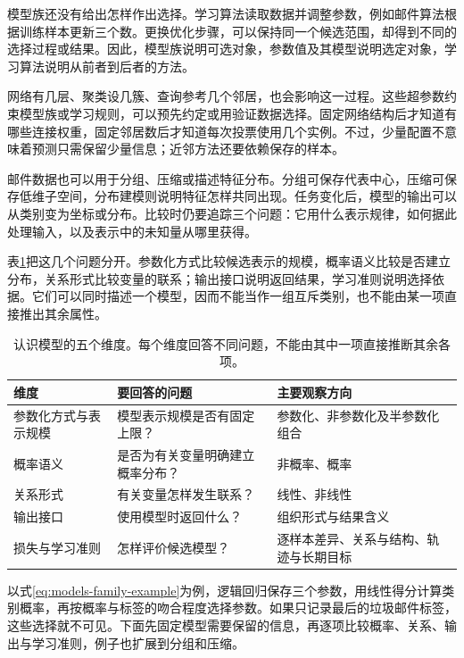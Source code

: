 模型族还没有给出怎样作出选择。学习算法读取数据并调整参数，例如邮件算法根据训练样本更新三个数。更换优化步骤，可以保持同一个候选范围，却得到不同的选择过程或结果。因此，模型族说明可选对象，参数值及其模型说明选定对象，学习算法说明从前者到后者的方法。

网络有几层、聚类设几簇、查询参考几个邻居，也会影响这一过程。这些超参数约束模型族或学习规则，可以预先约定或用验证数据选择。固定网络结构后才知道有哪些连接权重，固定邻居数后才知道每次投票使用几个实例。不过，少量配置不意味着预测只需保留少量信息；近邻方法还要依赖保存的样本。

邮件数据也可以用于分组、压缩或描述特征分布。分组可保存代表中心，压缩可保存低维子空间，分布建模则说明特征怎样共同出现。任务变化后，模型的输出可以从类别变为坐标或分布。比较时仍要追踪三个问题：它用什么表示规律，如何据此处理输入，以及表示中的未知量从哪里获得。

表\ref{tab:models-dimensions}把这几个问题分开。参数化方式比较候选表示的规模，概率语义比较是否建立分布，关系形式比较变量的联系；输出接口说明返回结果，学习准则说明选择依据。它们可以同时描述一个模型，因而不能当作一组互斥类别，也不能由某一项直接推出其余属性。

\begin{table}[htbp]
  \centering
  \small
  \begin{tabularx}{\linewidth}{@{}lXX@{}}
    \toprule
    \textbf{维度} & \textbf{要回答的问题} & \textbf{主要观察方向} \\
    \midrule
参数化方式与表示规模 & 模型表示规模是否有固定上限？ & 参数化、非参数化及半参数化组合 \\
    概率语义 & 是否为有关变量明确建立概率分布？ & 非概率、概率 \\
    关系形式 & 有关变量怎样发生联系？ & 线性、非线性 \\
    输出接口 & 使用模型时返回什么？ & 组织形式与结果含义 \\
    损失与学习准则 & 怎样评价候选模型？ & 逐样本差异、关系与结构、轨迹与长期目标 \\
    \bottomrule
  \end{tabularx}
  \caption{认识模型的五个维度。每个维度回答不同问题，不能由其中一项直接推断其余各项。}
  \label{tab:models-dimensions}
\end{table}

以式\eqref{eq:models-family-example}为例，逻辑回归保存三个参数，用线性得分计算类别概率，再按概率与标签的吻合程度选择参数。如果只记录最后的垃圾邮件标签，这些选择就不可见。下面先固定模型需要保留的信息，再逐项比较概率、关系、输出与学习准则，例子也扩展到分组和压缩。

